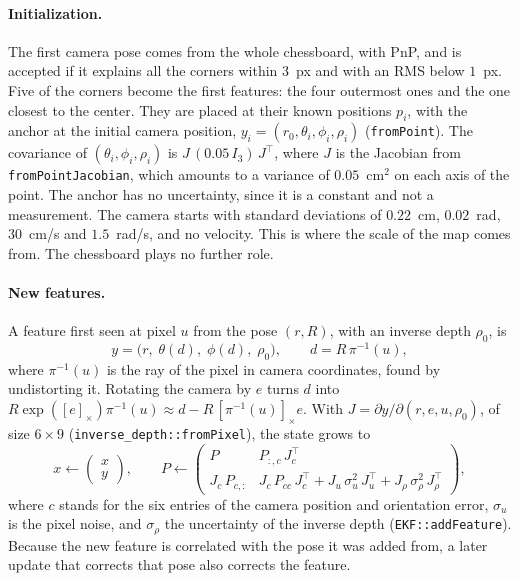 \documentclass[11pt]{article}
\begin{document}
\paragraph{Initialization.}
The first camera pose comes from the whole chessboard, with PnP, and is accepted if it explains all
the corners within $3$~px and with an RMS below $1$~px. Five of the corners become the first
features: the four outermost ones and the one closest to the center. They are placed at their
known positions $p_i$, with the anchor at the initial camera position,
$y_i = (r_0, \theta_i, \phi_i, \rho_i)$ (\texttt{fromPoint}). The covariance of
$(\theta_i, \phi_i, \rho_i)$ is $J\, (0.05\, I_3)\, J^\top$, where $J$ is the Jacobian from
\texttt{fromPointJacobian}, which amounts to a variance of $0.05$~cm$^2$ on each axis of the point.
The anchor has no uncertainty, since it is a constant and not a measurement. The camera starts with
standard deviations of $0.22$~cm, $0.02$~rad, $30$~cm/s and $1.5$~rad/s, and no velocity. This is
where the scale of the map comes from. The chessboard plays no further role.

\paragraph{New features.}
A feature first seen at pixel $u$ from the pose $(r, R)$, with an inverse depth $\rho_0$, is
\begin{equation}
  y = \big(r,\; \theta(d),\; \phi(d),\; \rho_0\big), \qquad d = R\, \pi^{-1}(u),
\end{equation}
where $\pi^{-1}(u)$ is the ray of the pixel in camera coordinates, found by undistorting it.
Rotating the camera by $e$ turns $d$ into $R \exp([e]_\times) \pi^{-1}(u) \approx d - R\,
[\pi^{-1}(u)]_\times e$. With $J = \partial y / \partial (r, e, u, \rho_0)$, of size $6 \times 9$
(\texttt{inverse\_depth::fromPixel}), the state grows to
\begin{equation}
  x \leftarrow \begin{pmatrix} x \\ y \end{pmatrix},
  \qquad
  P \leftarrow
  \begin{pmatrix}
    P & P_{:, c}\, J_c^\top \\
    J_c\, P_{c, :} & J_c\, P_{cc}\, J_c^\top + J_u\, \sigma_u^2\, J_u^\top + J_\rho\, \sigma_\rho^2\, J_\rho^\top
  \end{pmatrix},
\end{equation}
where $c$ stands for the six entries of the camera position and orientation error, $\sigma_u$ is the
pixel noise, and $\sigma_\rho$ the uncertainty of the inverse depth (\texttt{EKF::addFeature}).
Because the new feature is correlated with the pose it was added from, a later update that
corrects that pose also corrects the feature.
\end{document}

